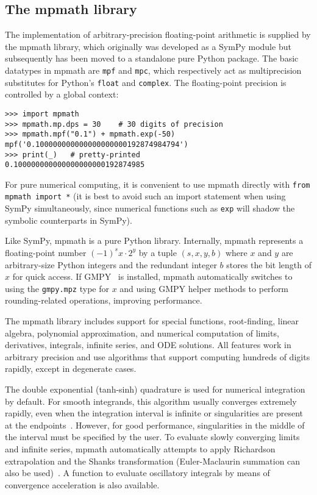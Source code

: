 \subsection{The mpmath library}

The implementation of arbitrary-precision floating-point arithmetic is
supplied by the mpmath library, which originally was developed as a SymPy
module but subsequently has been moved to a standalone pure Python package.
The basic datatypes in mpmath are \texttt{mpf} and \texttt{mpc}, which
respectively act as multiprecision substitutes for Python's \texttt{float} and
\texttt{complex}. The floating-point precision is controlled by a global
context:

\begin{verbatim}
>>> import mpmath
>>> mpmath.mp.dps = 30    # 30 digits of precision
>>> mpmath.mpf("0.1") + mpmath.exp(-50)
mpf('0.100000000000000000000192874984794')
>>> print(_)   # pretty-printed
0.100000000000000000000192874985
\end{verbatim}

For pure numerical computing, it is convenient to use mpmath directly
with \texttt{from mpmath import *} (it is best to avoid such an
import statement when using SymPy simultaneously, since numerical
functions such as \texttt{exp} will shadow the symbolic counterparts
in SymPy).

Like SymPy, mpmath is a pure Python library.
Internally, mpmath represents a floating-point number
${(-1)}^s x \cdot 2^y$ by a tuple $(s, x, y, b)$ where
$x$ and $y$ are arbitrary-size Python integers
and the redundant integer $b$ stores the bit length of $x$ for quick access.
If GMPY~\cite{GMPY} is installed, mpmath automatically switches to
using the \texttt{gmpy.mpz} type for $x$ and using GMPY helper methods
to perform rounding-related operations, improving performance.

The mpmath library includes support for
special functions, root-finding, linear algebra, polynomial approximation,
and numerical computation of limits, derivatives, integrals, infinite
series, and ODE solutions. All features work in arbitrary precision
and use algorithms that support computing hundreds of digits rapidly,
except in degenerate cases.

The double exponential (tanh-sinh) quadrature is used for numerical
integration by default. For smooth integrands, this algorithm usually
converges extremely rapidly, even when the integration interval is infinite
or singularities are present at the endpoints~\cite{takahasi1974double,bailey2005comparison}.
However, for good performance, singularities
in the middle of the interval must be specified
by the user.
To evaluate slowly converging limits and infinite series, mpmath
automatically attempts to apply Richardson extrapolation and the
Shanks transformation
(Euler-Maclaurin summation can also be used)~\cite{BenderOrszag1999}.
A function to evaluate oscillatory integrals by means of convergence
acceleration is also available.

